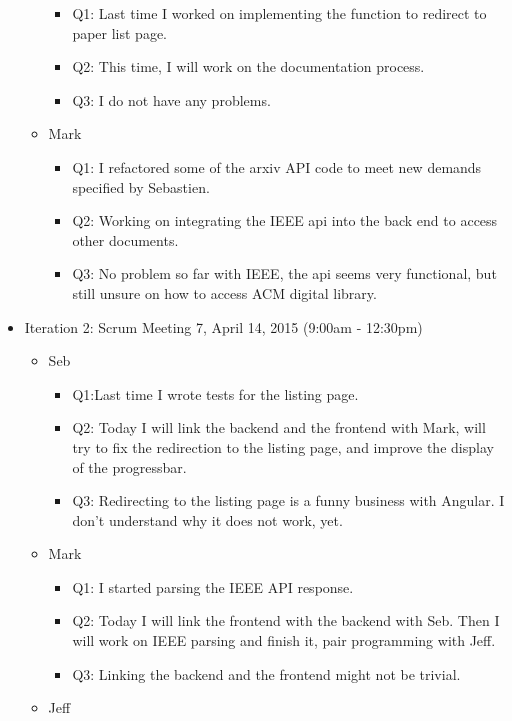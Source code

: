 \documentclass[]{article}
\begin{document}
\begin{itemize}
\begin{itemize}
    \begin{itemize}
    \itemsep1pt\parskip0pt
    \item
      Q1: Last time I worked on implementing the function to redirect to
      paper list page.
    \item
      Q2: This time, I will work on the documentation process.
    \item
      Q3: I do not have any problems.
    \end{itemize}
  \item
    Mark

    \begin{itemize}
    \itemsep1pt\parskip0pt
    \item
      Q1: I refactored some of the arxiv API code to meet new demands
      specified by Sebastien.
    \item
      Q2: Working on integrating the IEEE api into the back end to
      access other documents.
    \item
      Q3: No problem so far with IEEE, the api seems very functional,
      but still unsure on how to access ACM digital library.
    \end{itemize}
  \end{itemize}
\item
  Iteration 2: Scrum Meeting 7, April 14, 2015 (9:00am - 12:30pm)

  \begin{itemize}
  \itemsep1pt\parskip0pt
  \item
    Seb

    \begin{itemize}
    \itemsep1pt\parskip0pt
    \item
      Q1:Last time I wrote tests for the listing page.
    \item
      Q2: Today I will link the backend and the frontend with Mark, will
      try to fix the redirection to the listing page, and improve the
      display of the progressbar.
    \item
      Q3: Redirecting to the listing page is a funny business with
      Angular. I don't understand why it does not work, yet.
    \end{itemize}
  \item
    Mark

    \begin{itemize}
    \itemsep1pt\parskip0pt
    \item
      Q1: I started parsing the IEEE API response.
    \item
      Q2: Today I will link the frontend with the backend with Seb. Then
      I will work on IEEE parsing and finish it, pair programming with
      Jeff.
    \item
      Q3: Linking the backend and the frontend might not be trivial.
    \end{itemize}
  \item
    Jeff


\end{itemize}
\end{itemize}
\end{document}
